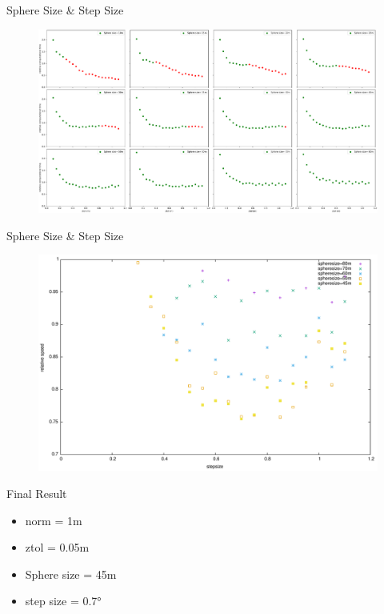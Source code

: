 \documentclass{beamer}
\begin{document}
\begin{frame}{Sphere Size \& Step Size}
	\begin{figure}
		\includegraphics[width=\textwidth]{figures/subplotofallztolsphere.pdf}
	\end{figure}
\end{frame}
\begin{frame}{Sphere Size \& Step Size}
	\begin{figure}
		\includegraphics[width=\textwidth]{figures/SphereAndStepFinal.pdf}
	\end{figure}
\end{frame}
\begin{frame}{Final Result}
	\begin{itemize}
		\item norm = 1m
		\item ztol = 0.05m
		\item Sphere size = 45m
		\item step size = 0.7°
	\end{itemize}
\end{frame}
\end{document}
